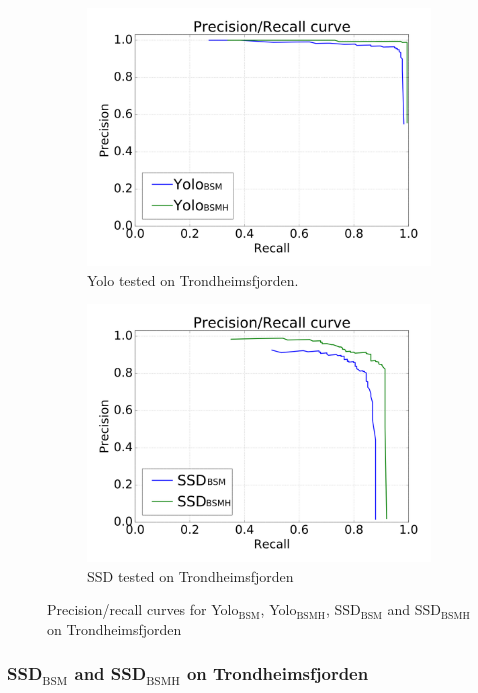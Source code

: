 \begin{figure}[h!]
\begin{subfigure}{.5\textwidth}
  \centering
  \includegraphics[width=0.8\linewidth]{results/case_buildings/prec_recall/yolo/trf-eps.png}
  \caption{Yolo tested on Trondheimsfjorden.}
  \label{fig:ex_trf_prec_rec_yolo}
\end{subfigure}%
\begin{subfigure}{.5\textwidth}
  \centering
  \includegraphics[width=.8\linewidth]{results/case_buildings/prec_recall/ssd/trf-eps.png}
  \caption{SSD tested on Trondheimsfjorden}
  \label{fig:ex_trf_prec_rec_ssd}
\end{subfigure}
\caption{Precision/recall curves for Yolo$_{\text{BSM}}$, Yolo$_{\text{BSMH}}$, SSD$_{\text{BSM}}$ and SSD$_{\text{BSMH}}$ on Trondheimsfjorden}
\label{fig:trf_prec}
\end{figure}

\subsubsection{SSD$_{\text{BSM}}$ and SSD$_{\text{BSMH}}$ on Trondheimsfjorden}

